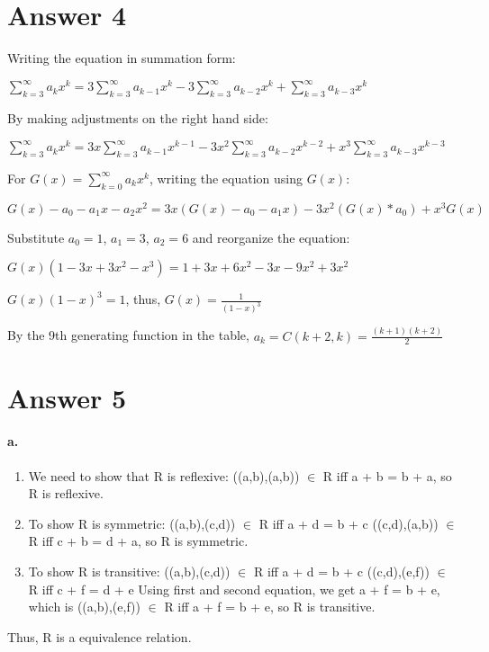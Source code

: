 \documentclass[11pt]{article}
\begin{document}
\section*{Answer 4}
Writing the equation in summation form: \newline \newline
\centerline{$\sum_{k=3}^{\infty}a_k x^k = 3\sum_{k=3}^{\infty}a_{k-1}x^k - 3\sum_{k=3}^{\infty}a_{k-2}x^k + \sum_{k=3}^{\infty} a_{k-3}x^k$} \newline \newline
By making adjustments on the right hand side: \newline \newline
\centerline{$\sum_{k=3}^{\infty}a_k x^k = 3x\sum_{k=3}^{\infty}a_{k-1}x^{k-1} - 3x^2\sum_{k=3}^{\infty}a_{k-2}x^{k-2} + x^3\sum_{k=3}^{\infty} a_{k-3}x^{k-3}$} \newline \newline
For $G(x) = \sum_{k=0}^{\infty}a_k x^k$, writing the equation using $G(x)$: \newline \newline
\centerline{$G(x) - a_0 - a_1x - a_2x^2 = 3x(G(x) - a_0 - a_1x) - 3x^2(G(x) * a_0) + x^3G(x)$} \newline \newline
Substitute $a_0 = 1$, $a_1 = 3$, $a_2 = 6$ and reorganize the equation: \newline \newline
\centerline{$G(x)(1 - 3x + 3x^2 - x^3) = 1 + 3x + 6x^2 - 3x - 9x^2 + 3x^2$} \newline \newline
\centerline{$G(x)(1-x)^3 = 1$, thus, $G(x) = \frac{1}{(1-x)^3}$} \newline \newline
By the 9th generating function in the table, $a_k = C(k+2,k) = \frac{(k+1)(k+2)}{2}$ 
\section*{Answer 5}
\paragraph{a.}
\begin{enumerate}
    \item We need to show that R is reflexive: \newline
    ((a,b),(a,b)) $\in$ R iff a + b = b + a, so R is reflexive.
    \item To show R is symmetric: \newline
    ((a,b),(c,d)) $\in$ R iff a + d = b + c \newline
    ((c,d),(a,b)) $\in$ R iff c + b = d + a, so R is symmetric.
    \item To show R is transitive: \newline
    ((a,b),(c,d)) $\in$ R iff a + d = b + c \newline
    ((c,d),(e,f)) $\in$ R iff c + f = d + e \newline
    Using first and second equation, we get a + f = b + e, which is \newline
    ((a,b),(e,f)) $\in$ R iff a + f = b + e, so R is transitive.
\end{enumerate}
Thus, R is a equivalence relation.
\end{document}
